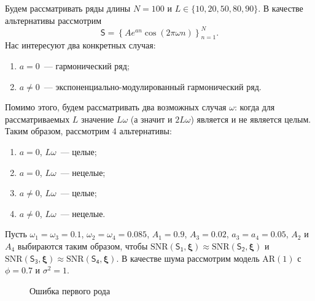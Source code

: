 \documentclass[specialist,
substylefile = spbu_report.rtx,
subf,href,colorlinks=true, 12pt]{disser}
\theoremstyle{definition}
\begin{document}
Будем рассматривать ряды длины $N=100$ и $L\in\{10,20,50,80,90\}$. В качестве альтернативы рассмотрим
$$
	\mathsf{S}=\left\{Ae^{a n}\cos(2\pi\omega n)\right\}_{n=1}^N.
$$
Нас интересуют два конкретных случая:
\begin{enumerate}
	\item $a=0$~--- гармонический ряд;
	\item $a\ne0$~--- экспоненциально-модулированный гармонический ряд.
\end{enumerate}

Помимо этого, будем рассматривать два возможных случая $\omega$: когда для рассматриваемых $L$ значение $L\omega$ (а значит и $2L\omega$) является и не является целым. Таким образом, рассмотрим 4 альтернативы:
\begin{enumerate}
	\item $a=0$, $L\omega$~--- целые;
	\item $a=0$, $L\omega$~--- нецелые;
	\item $a\ne0$, $L\omega$~--- целые;
	\item  $a\ne0$, $L\omega$~--- нецелые.
\end{enumerate}

Пусть $\omega_1=\omega_3=0.1$, $\omega_2=\omega_4=0.085$, $A_1=0.9$, $A_3=0.02$, $a_3=a_4=0.05$, $A_2$ и $A_4$ выбираются таким образом, чтобы $\mathrm{SNR}(\mathsf{S_1}, \bm\xi)\approx\mathrm{SNR}(\mathsf{S_2}, \bm\xi)$ и $\mathrm{SNR}(\mathsf{S_3}, \bm\xi)\approx\mathrm{SNR}(\mathsf{S_4}, \bm\xi)$. В качестве шума рассмотрим модель AR$(1)$ с $\phi=0.7$ и $\sigma^2=1$.

\begin{figure}[h!]
	\centering
	\hfill
	\par
	\caption{Ошибка первого рода}
	\label{fig:mcssa_comp_alphaI}
\end{figure}
\end{document}
